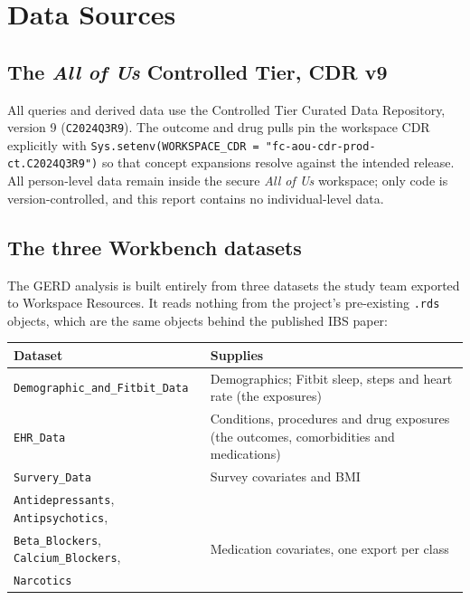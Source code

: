 \documentclass[11pt]{article}
\newcommand{\code}[1]{\texttt{\small #1}}
\begin{document}
\section{Data Sources}

\subsection{The \textit{All of Us} Controlled Tier, CDR v9}
All queries and derived data use the Controlled Tier Curated Data Repository, version 9
(\code{C2024Q3R9}). The outcome and drug pulls pin the workspace CDR explicitly with
\code{Sys.setenv(WORKSPACE_CDR = "fc-aou-cdr-prod-ct.C2024Q3R9")} so that concept expansions resolve
against the intended release. All person-level data remain inside the secure \emph{All of Us}
workspace; only code is version-controlled, and this report contains no individual-level data.

\subsection{The three Workbench datasets}
The GERD analysis is built entirely from three datasets the study team
exported to Workspace Resources. It reads nothing from the project's
pre-existing \code{.rds} objects, which are the same objects behind the
published IBS paper:

\begin{table}[h]
\centering
\begin{tabular}{@{}l p{9.5cm}@{}}
\toprule
\textbf{Dataset} & \textbf{Supplies} \\
\midrule
\code{Demographic\_and\_Fitbit\_Data} & Demographics; Fitbit sleep, steps and heart rate (the exposures) \\
\code{EHR\_Data} & Conditions, procedures and drug exposures (the outcomes, comorbidities and medications) \\
\code{Survery\_Data} & Survey covariates and BMI \\
\code{Antidepressants}, \code{Antipsychotics}, & \\
\code{Beta\_Blockers}, \code{Calcium\_Blockers}, & Medication covariates, one export per class \\
\code{Narcotics} & \\
\bottomrule
\end{tabular}
\end{table}
\end{document}
